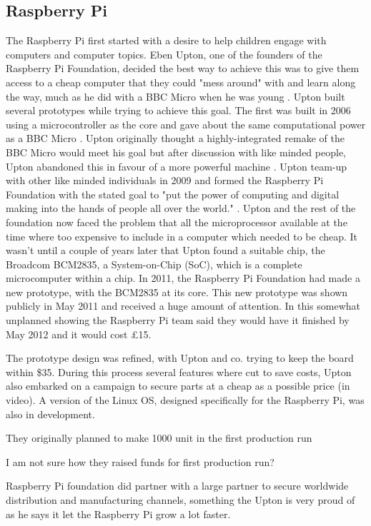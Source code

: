 \subsection{Raspberry Pi}
The Raspberry Pi first started with a desire to help children engage with computers and computer topics. Eben Upton, one of the founders of the Raspberry Pi Foundation, decided the best way to achieve this was to give them access to a cheap computer that they could "mess around" with and learn along the way, much as he did with a BBC Micro when he was young 
\cite{RN98}. Upton built several prototypes while trying to achieve this goal. The first was built in 2006 using a microcontroller as the core and gave about the same computational power as a BBC Micro 
\cite{RN137}. Upton originally thought a highly-integrated remake of the BBC Micro would meet his goal but after discussion with like minded people, Upton abandoned this in favour of a more powerful machine 
\cite{RN98}. Upton team-up with other like minded individuals in 2009 and formed the Raspberry Pi Foundation with the stated goal to "put the power of computing and digital making into the hands of people all over the world." 
\cite{RN138}. Upton and the rest of the foundation now faced the problem that all the microprocessor available at the time where too expensive to include in a computer which needed to be cheap. It wasn't until a couple of years later that Upton found a suitable chip, the Broadcom BCM2835, a System-on-Chip (SoC), which is a complete microcomputer within a chip. In 2011, the Raspberry Pi Foundation had made a new prototype, with the BCM2835 at its core. This new prototype was shown publicly in May 2011 and received a huge amount of attention. In this somewhat unplanned showing the Raspberry Pi team said they would have it finished by May 2012 and it would cost \pounds 15.   

The prototype design was refined, with Upton and co. trying to keep the board within \$35. During this process several features where cut to save costs, Upton also embarked on a campaign to secure parts at a cheap as a possible price (in video). A version of the Linux OS, designed specifically for the Raspberry Pi, was also in development.

They originally planned to make 1000 unit in the first production run
 \cite{RN139}

I am not sure how they raised funds for first production run?

Raspberry Pi foundation did partner with a large partner to secure worldwide distribution and manufacturing channels, something the Upton is very proud of as he says it let the Raspberry Pi grow a lot faster.


